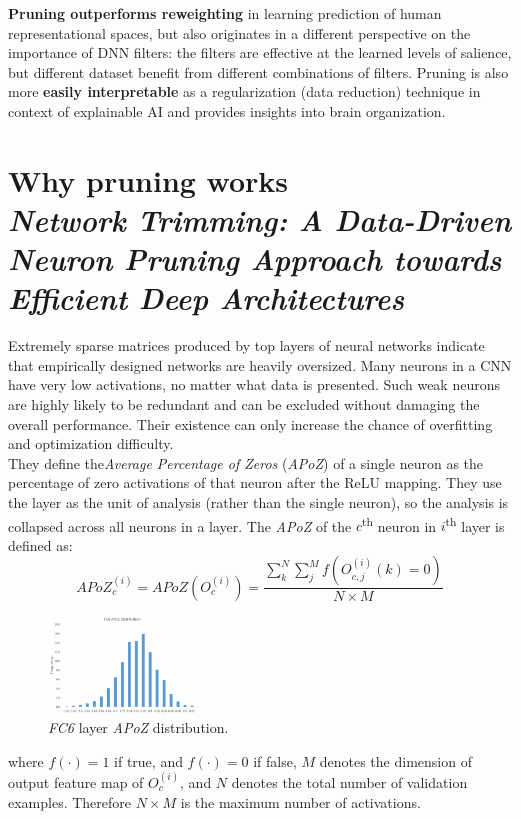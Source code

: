 \textbf{Pruning outperforms reweighting} in learning prediction of human representational spaces, but also originates in a different perspective on the importance of DNN filters: the filters are effective at the learned levels of salience, but different dataset benefit from different combinations of filters. Pruning is also more \textbf{easily interpretable} as a regularization (data reduction) technique in context of explainable AI and provides insights into brain organization.

\section[Why pruning works]{Why pruning works\\ \textit{Network Trimming: A Data-Driven Neuron Pruning Approach towards Efficient Deep Architectures}\\ }
Extremely sparse matrices produced by top layers of neural networks indicate that empirically designed networks are heavily oversized. Many neurons in a CNN have very low activations, no matter what data is presented. Such weak neurons are highly likely to be redundant and can be excluded without damaging the overall performance. Their existence can only increase the chance of overfitting and optimization difficulty.\\

They define the\textit{Average Percentage of Zeros} (\textit{APoZ}) of a single neuron as the percentage of zero activations of that neuron after the ReLU mapping. They use the layer as the unit of analysis (rather than the single neuron), so the analysis is collapsed across all neurons in a layer. The \textit{APoZ} of the $c$\textsuperscript{th} neuron in $i$\textsuperscript{th} layer is defined as:
\[
APoZ_c^{(i)} = APoZ(O_c^{(i)}) = \frac{\sum_k^N \sum_j^M f(O_{c,j}^{(i)}(k)=0)}{N\times M}
\]

\begin{figure}
  \centering
  \includegraphics[width=0.35\textwidth]{images/apoz.png}
  \caption{\textit{FC6} layer \textit{APoZ} distribution.}
  \label{fig:apoz}
\end{figure}
where $f(\cdot) = 1$ if true, and $f(\cdot) = 0$ if false, $M$ denotes the dimension of output feature map of $O_c^{(i)}$, and $N$ denotes the total number of validation examples. Therefore $N\times M$ is the maximum number of activations.\\

